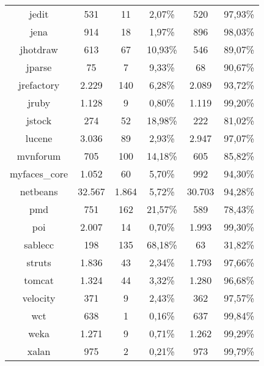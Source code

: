 \begin{table}
\begin{tabularx}{\textwidth}{c|c|c|c|c|c}
		jedit & 531 & 11 & 2,07\% & 520 & 97,93\% \\
		jena & 914 & 18 & 1,97\% & 896 & 98,03\% \\
		jhotdraw & 613 & 67 & 10,93\% & 546 & 89,07\% \\
		jparse & 75 & 7 & 9,33\% & 68 & 90,67\% \\
		jrefactory & 2.229 & 140 & 6,28\% & 2.089 & 93,72\% \\
		jruby & 1.128 & 9 & 0,80\% & 1.119 & 99,20\% \\
		jstock & 274 & 52 & 18,98\% & 222 & 81,02\% \\
		lucene & 3.036 & 89 & 2,93\% & 2.947 & 97,07\% \\
		mvnforum & 705 & 100 & 14,18\% & 605 & 85,82\% \\
		myfaces\_core & 1.052 & 60 & 5,70\% & 992 & 94,30\% \\
		netbeans & 32.567 & 1.864 & 5,72\% & 30.703 & 94,28\% \\
		pmd & 751 & 162 & 21,57\% & 589 & 78,43\% \\
		poi & 2.007 & 14 & 0,70\% & 1.993 & 99,30\% \\
		sablecc & 198 & 135 & 68,18\% & 63 & 31,82\% \\
		struts & 1.836 & 43 & 2,34\% & 1.793 & 97,66\% \\
		tomcat & 1.324 & 44 & 3,32\% & 1.280 & 96,68\% \\
		velocity & 371 & 9 & 2,43\% & 362 & 97,57\% \\
		wct & 638 & 1 & 0,16\% & 637 & 99,84\% \\
		weka & 1.271 & 9 & 0,71\% & 1.262 & 99,29\% \\
		xalan & 975 & 2 & 0,21\% & 973 & 99,79\% \\
	\end{tabularx}
\end{table}
\setlength{\extrarowheight}{0em}